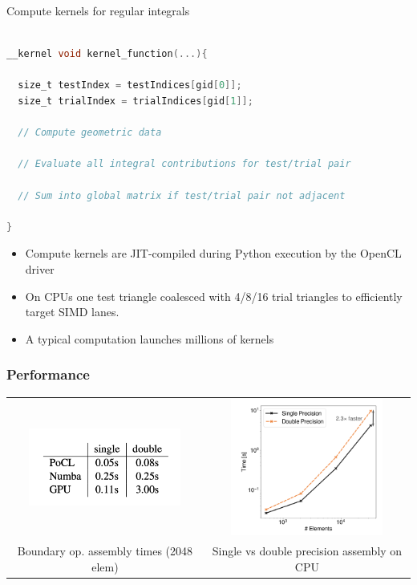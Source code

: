 \documentclass[dvipsnames,10pt]{beamer}
\begin{document}
\begin{frame}[fragile]{Compute kernels for regular integrals}

{\footnotesize
\begin{lstlisting}[language=C]

__kernel void kernel_function(...){

  size_t testIndex = testIndices[gid[0]];
  size_t trialIndex = trialIndices[gid[1]];

  // Compute geometric data
  
  // Evaluate all integral contributions for test/trial pair
  
  // Sum into global matrix if test/trial pair not adjacent

}

\end{lstlisting}
}
\begin{tcolorbox}
    \begin{itemize}
        \item Compute kernels are JIT-compiled during Python execution by the OpenCL driver
        \item On CPUs one test triangle coalesced with 4/8/16 trial triangles to efficiently target SIMD lanes.
        \item A typical computation launches millions of kernels
    \end{itemize}
\end{tcolorbox}

\end{frame}

\begin{frame}
	\frametitle{Performance}
	
	\begin{center}
	\begin{tabular}{cc}
		\includegraphics[width=5cm]{../figs/cpu_vs_gpu.png} &
		\includegraphics[width=5cm]{../figs/single_vs_double.png}\\
		\begin{minipage}{5cm}
			Boundary op. assembly times (2048 elem)
		\end{minipage} &
		\begin{minipage}{5cm}
			Single vs double precision assembly on CPU
		\end{minipage}
	\end{tabular}
	\end{center}
\end{frame}
		
\end{document}
